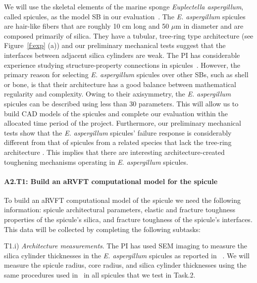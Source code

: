 \documentclass[10pt,letterpaper]{article}
\begin{document}
    We will use the skeletal elements of the marine sponge \textit{Euplectella aspergillum}, called spicules, as the model SB in our evaluation~\cite{mayer2004lessons,sarikaya2001biomimetic}.
    The \textit{E. aspergillum} spicules are hair-like fibers that are roughly 10 cm long and 50 $\mu$m in diameter and are composed primarily of silica.
    They have a tubular, tree-ring type architecture (see Figure~\ref{f:exp} (a)) and our preliminary mechanical tests suggest that the interfaces between adjacent silica cylinders are weak.
    The PI has considerable experience studying structure-property connections in spicules~\cite{monn2015new,monn2017enhanced,monn2017new}.
    However, the primary reason for selecting \textit{E. aspergillum} spicules over other SBs, such as shell or bone, is that their architecture has a good balance between mathematical regularity and complexity.
     Owing to their axisymmetry, the \textit{E. aspergillum} spicules can be described using less than 30 parameters.
    This will allow us to build CAD models of the spicules and complete our evaluation within the allocated time period of the project.
    Furthermore, our preliminary mechanical tests show that the \textit{E. aspergillum} spicules' failure response is considerably different from that of spicules from a related species that lack the tree-ring architecture \cite{monn2017enhanced}.
    This implies that there are interesting architecture-created toughening mechanisms operating in \textit{E. aspergillum} spicules.

    \paragraph{A2.T1:  Build an aRVFT computational model for the spicule}
      To build an aRVFT computational model of the spicule we need the following information: spicule architectural parameters,
      elastic and fracture toughness properties of the spicule's silica,
      and fracture toughness of the spicule's interfaces.
      This data will be collected by completing the following subtasks:

      {\selectfont T1.i}) \textit{Architecture measurements}.
        The PI has used SEM imaging to measure the silica cylinder thicknesses in the \textit{E. aspergillum} spicules as reported in ~\cite{monn2015new}.
        We will measure the spicule radius, core radius, and silica cylinder thicknesses using the same procedures used in~\cite{monn2015new} in all spicules that we test in Task.2.
\end{document}
